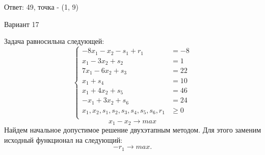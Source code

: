 \documentclass{article}%
\begin{document}
\begin{flushright}%
Ответ: 49, точка {-} (1, 9)%
\end{flushright}%
\newpage%
\begin{center}%
\begin{Huge}%
Вариант 17%
\end{Huge}%
\end{center}%
Задача равносильна следующей: %
\[%
\left\{\begin{aligned}-8x_{1}-x_{2}-s_{1}+r_{1} & =-8 \\x_{1}-3x_{2}+s_{2} & =1 \\7x_{1}-6x_{2}+s_{3} & =22 \\x_{1}+s_{4} & =10 \\x_{1}+4x_{2}+s_{5} & =46 \\-x_{1}+3x_{2}+s_{6} & =24 \\x_{1},x_{2},s_{1},s_{2},s_{3},s_{4},s_{5},s_{6},r_{1} & \ge 0 \\ \end{aligned}\right.%
\]%
\[%
x_{1}-x_{2}  \to max%
\]%
Найдем начальное допустимое решение двухэтапным методом. Для этого заменим исходный функционал на следующий: %
\[%
-r_{1}\to max.%
\]%
\end{document}
